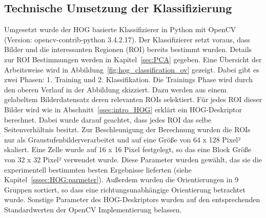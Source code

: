 \subsection{Technische Umsetzung der Klassifizierung} \label{ssec:implementation}
Umgesetzt wurde der HOG basierte Klassifizierer in Python mit OpenCV (Version: opencv-contrib-python 3.4.2.17). Der Klassifizierer setzt voraus, dass Bilder und die interessanten Regionen (ROI) bereits bestimmt wurden. Details zur ROI Bestimmungen werden in Kapitel~\ref{sec:PCA} gegeben. Eine Übersicht der Arbeitsweise wird in Abbildung~\ref{fig:hog_classification_ov} gezeigt. Dabei gibt es zwei Phasen: 1. Training und 2. Klassifikation. Die Trainings Phase wird durch den oberen Verlauf in der Abbildung skizziert. Dazu werden aus einem gelabeltem Bilderdatensatz deren relevanten ROIs selektiert. Für jedes ROI dieser Bilder wird wie in Abschnitt~\ref{ssec:intro_HOG} erklärt ein HOG-Deskriptor berechnet. Dabei wurde darauf geachtet, dass jedes ROI das selbe Seitenverhältnis besitzt. Zur Beschleunigung der Berechnung wurden die ROIs nur als Graustufenbilderverarbeitet und auf eine Größe von 64 x 128 Pixel² skaliert. Eine Zelle wurde auf 16 x 16 Pixel festgelegt, so das eine Block Größe von 32 x 32 Pixel² verwendet wurde. Diese Parameter wurden gewählt, das sie die experimentell bestimmten besten Ergebnisse lieferten (siehe Kapitel~\ref{sssec:HOG:parmeter}). Außerdem wurden die Orientierungen in 9 Gruppen sortiert, so dass eine richtungsunabhängige Orientierung betrachtet wurde. Sonstige Parameter des HOG-Deskriptors wurden auf den entsprechenden Standardwerten der OpenCV Implementierung belassen. 

